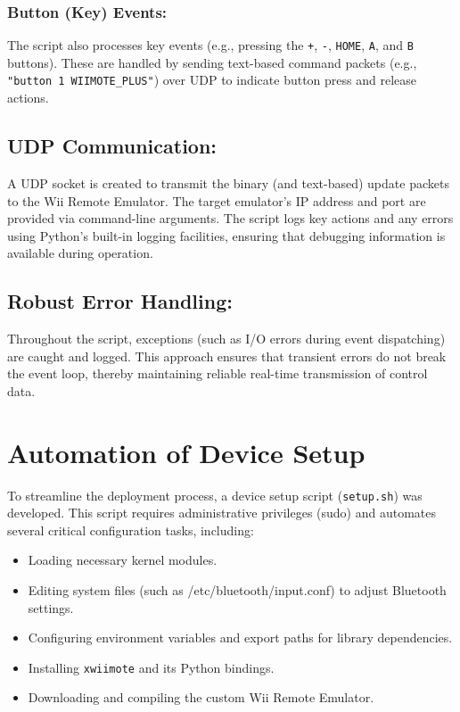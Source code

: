 \subsubsection*{Button (Key) Events:}
The script also processes key events (e.g., pressing the \texttt{+}, \texttt{-}, \texttt{HOME}, \texttt{A}, and \texttt{B} buttons). These are handled by sending text-based command packets (e.g., \texttt{"button 1 WIIMOTE\_PLUS"}) over UDP to indicate button press and release actions.

\subsection*{UDP Communication:}
A UDP socket is created to transmit the binary (and text-based) update packets to the Wii Remote Emulator. The target emulator’s IP address and port are provided via command-line arguments. The script logs key actions and any errors using Python’s built-in logging facilities, ensuring that debugging information is available during operation.

\subsection*{Robust Error Handling:}
Throughout the script, exceptions (such as I/O errors during event dispatching) are caught and logged. This approach ensures that transient errors do not break the event loop, thereby maintaining reliable real-time transmission of control data.

\section{Automation of Device Setup}

To streamline the deployment process, a device setup script (\texttt{setup.sh}) was developed. This script requires administrative privileges (sudo) and automates several critical configuration tasks, including:

\begin{itemize}

	\item Loading necessary kernel modules.
	\item Editing system files (such as /etc/bluetooth/input.conf) to adjust Bluetooth settings.
	\item Configuring environment variables and export paths for library dependencies.
    \item Installing \texttt{xwiimote} and its Python bindings.
    \item Downloading and compiling the custom Wii Remote Emulator.
\end{itemize}

